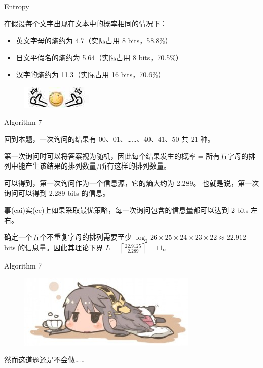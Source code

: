 \documentclass[UTF8]{beamer}
\begin{document}
\begin{frame}{Entropy}

在假设每个文字出现在文本中的概率相同的情况下：
\begin{itemize}
    \item 英文字母的熵约为 4.7（实际占用 8 bits，58.8\%）
    \item 日文平假名的熵约为 5.64（实际占用 8 bits，70.5\%）
    \item 汉字的熵约为 11.3（实际占用 16 bits，70.6\%）
\end{itemize}
\pause
\begin{figure}[h]\centering
\includegraphics[scale=0.028]{uu.jpg}
\end{figure}

\end{frame}

\begin{frame}{Algorithm 7}

回到本题，一次询问的结果有 00、01、……、40、41、50 共 21 种。

\pause
第一次询问时可以将答案视为随机，因此每个结果发生的概率 = %
所有五字母的排列中能产生该结果的排列数量/所有这样的排列数量。

\pause
可以得到，第一次询问作为一个信息源，它的熵大约为 2.289。%
也就是说，第一次询问可以得到 2.289 bits 的信息。

事(cai)实(ce)上如果采取最优策略，每一次询问包含的信息量都可以达到 2 bits 左右。

\pause
确定一个五个不重复字母的排列需要至少 %
$\log_{2} 26 \times 25 \times 24 \times 23 \times 22 \approx 22.912$ %
bits 的信息量。因此其理论下界 $L = \left\lceil \frac{22.9125}{2.289} \right\rceil = 11$。

\end{frame}

\begin{frame}{Algorithm 7}

\begin{figure}[h]\centering
\includegraphics[scale=0.5]{vv.jpg}
\end{figure}

然而这道题还是不会做……

\end{frame}
\end{document}
